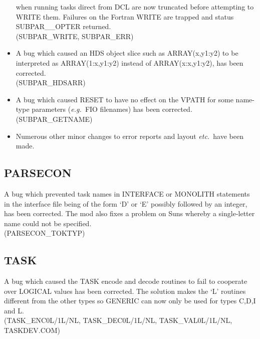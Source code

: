 \begin{itemize}
when running tasks direct from DCL are now truncated before attempting to
WRITE them.
Failures on the Fortran WRITE are trapped and status SUBPAR\_\_OPTER returned.\\
(SUBPAR\_WRITE, SUBPAR\_ERR)
\item A bug which caused an HDS object slice such as ARRAY(x,y1:y2) to be
interpreted as ARRAY(1:x,y1:y2) instead of ARRAY(x:x,y1:y2), has been
corrected.\\
(SUBPAR\_HDSARR)
\item A bug which caused RESET to have no effect on the VPATH for some
name-type parameters ({\em e.g.\ }FIO filenames) has been corrected.\\
(SUBPAR\_GETNAME)
\item Numerous other minor changes to error reports and layout
{\em etc.\ }have been made.
\end{itemize}

\subsection{PARSECON}
A bug which prevented task names in INTERFACE or MONOLITH statements in the
interface file being of the form `D' or `E' possibly followed by
an integer, has been corrected. The mod also fixes a problem on Suns whereby a
single-letter name could not be specified.\\
(PARSECON\_TOKTYP)

\subsection{TASK}
A bug which caused the TASK encode and decode routines to fail to cooperate
over LOGICAL values has been corrected. The solution makes the `L' routines
different from the other types so GENERIC can now only be used for types C,D,I
and L.\\
(TASK\_ENC0L/1L/NL, TASK\_DEC0L/1L/NL, TASK\_VAL0L/1L/NL, TASKDEV.COM)

